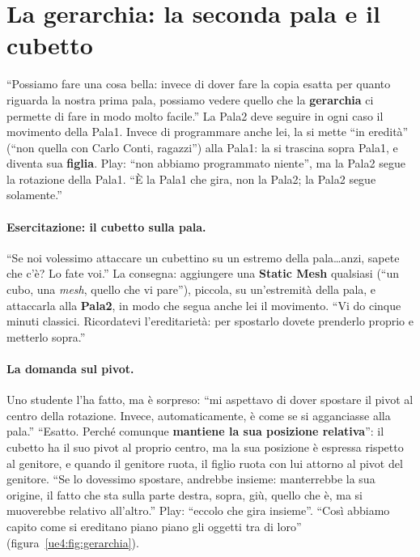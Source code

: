 \section{La gerarchia: la seconda pala e il cubetto}
\label{ue4:sec:gerarchia}

``Possiamo fare una cosa bella: invece di dover fare la copia esatta per quanto
riguarda la nostra prima pala, possiamo vedere quello che la \textbf{gerarchia} ci
permette di fare in modo molto facile.'' La Pala2 deve seguire in ogni caso il movimento
della Pala1. Invece di programmare anche lei, la si mette ``in eredità'' (``non quella
con Carlo Conti, ragazzi'') alla Pala1: la si trascina sopra Pala1, e diventa sua
\textbf{figlia}. Play: ``non abbiamo programmato niente'', ma la Pala2 segue la
rotazione della Pala1. ``È la Pala1 che gira, non la Pala2; la Pala2 segue solamente.''

\paragraph{Esercitazione: il cubetto sulla pala.} ``Se noi volessimo attaccare un
cubettino su un estremo della pala\ldots anzi, sapete che c'è? Lo fate voi.'' La
consegna: aggiungere una \textbf{Static Mesh} qualsiasi (``un cubo, una \emph{mesh},
quello che vi pare''), piccola, su un'estremità della pala, e attaccarla alla
\textbf{Pala2}, in modo che segua anche lei il movimento. ``Vi do cinque minuti
classici. Ricordatevi l'ereditarietà: per spostarlo dovete prenderlo proprio e metterlo
sopra.''

\paragraph{La domanda sul pivot.} Uno studente l'ha fatto, ma è sorpreso: ``mi
aspettavo di dover spostare il pivot al centro della rotazione. Invece,
automaticamente, è come se si agganciasse alla pala.'' ``Esatto. Perché comunque
\textbf{mantiene la sua posizione relativa}'': il cubetto ha il suo pivot al proprio
centro, ma la sua posizione è espressa rispetto al genitore, e quando il genitore
ruota, il figlio ruota con lui attorno al pivot del genitore. ``Se lo dovessimo
spostare, andrebbe insieme: manterrebbe la sua origine, il fatto che sta sulla parte
destra, sopra, giù, quello che è, ma si muoverebbe relativo all'altro.'' Play: ``eccolo
che gira insieme''. ``Così abbiamo capito come si ereditano piano piano gli oggetti tra
di loro'' (figura~\ref{ue4:fig:gerarchia}).


